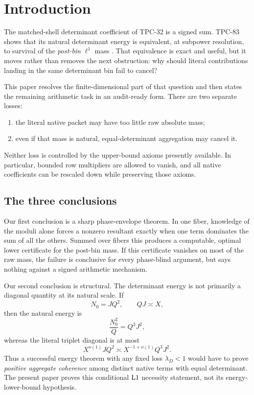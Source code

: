 \section{Introduction}
\label{sec:introduction}

The matched-shell determinant coefficient of TPC-32 is a signed sum.
TPC-83 shows that its natural determinant energy is equivalent, at
subpower resolution, to survival of the \emph{post-bin} \(\ell^1\)
mass \citep{WangTPC32,WangTPC83}.  That equivalence is exact and useful,
but it moves rather than removes the next obstruction: why should
literal contributions landing in the same determinant bin fail to
cancel?

This paper resolves the finite-dimensional part of that question and
then states the remaining arithmetic task in an audit-ready form.
There are two separate losses:
\begin{enumerate}[leftmargin=2.1em]
 \item the literal native packet may have too little raw absolute mass;
 \item even if that mass is natural, equal-determinant aggregation may
 cancel it.
\end{enumerate}
Neither loss is controlled by the upper-bound axioms presently
available.  In particular, bounded row multipliers are allowed to
vanish, and all native coefficients can be rescaled down while
preserving those axioms.

\subsection{The three conclusions}

Our first conclusion is a sharp phase-envelope theorem.  In one fiber,
knowledge of the moduli alone forces a nonzero resultant exactly when
one term dominates the sum of all the others.  Summed over fibers this
produces a computable, optimal lower certificate for the post-bin
mass.  If this certificate vanishes on most of the raw mass, the
failure is conclusive for every phase-blind argument, but says nothing
against a signed arithmetic mechanism.

Our second conclusion is structural.  The determinant energy is not
primarily a diagonal quantity at its natural scale.  If
\[
 N_0=JQ^2,\qquad QJ\asymp X,
\]
then the natural energy is
\[
 \frac{N_0^2}{Q}=Q^3J^2,
\]
whereas the literal triplet diagonal is at most
\[
 X^{o(1)}JQ^2
 \asymp X^{-1+o(1)}Q^3J^2.
\]
Thus a successful energy theorem with any fixed loss
\(\lambda_D<1\) would have to prove \emph{positive aggregate
coherence} among distinct native terms with equal determinant.  The
present paper proves this conditional \(\mathrm{L1}\) necessity statement,
not its energy-lower-bound hypothesis.

